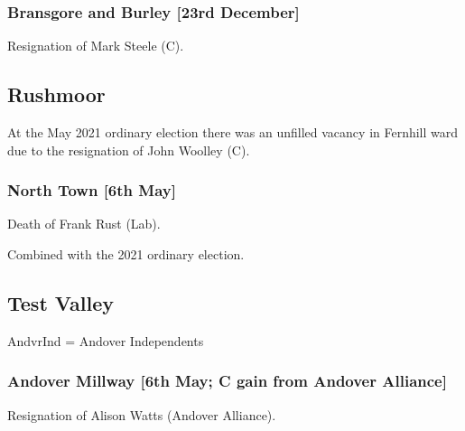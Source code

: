 \documentclass[a4paper,openany]{book}
\begin{document}
\begin{resultsiii}
\subsubsection*{Bransgore and Burley \hspace*{\fill}\nolinebreak[1]%
	\enspace\hspace*{\fill}
	[23rd December]}


Resignation of Mark Steele (C).

\subsection*{Rushmoor}

At the May 2021 ordinary election there was an unfilled vacancy in Fernhill ward due to the resignation of John Woolley (C).

\subsubsection*{North Town \hspace*{\fill}\nolinebreak[1]%
	\enspace\hspace*{\fill}
	[6th May]}


Death of Frank Rust (Lab).

Combined with the 2021 ordinary election.

\subsection*{Test Valley}

AndvrInd = Andover Independents

\subsubsection*{Andover Millway \hspace*{\fill}\nolinebreak[1]%
	\enspace\hspace*{\fill}
	[6th May; C gain from Andover Alliance]}


Resignation of Alison Watts (Andover Alliance).


\end{resultsiii}
\end{document}
